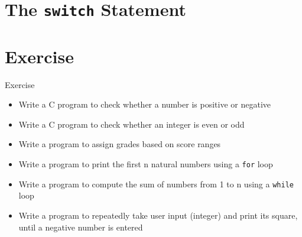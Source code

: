 \documentclass[12pt, aspectratio=169]{beamer}
\begin{document}
    \section{The \texttt{switch} Statement}


    \section{Exercise}

    \begin{frame}{Exercise}
        \begin{itemize}
            \item Write a C program to check whether a number is positive or negative
            \item Write a C program to check whether an integer is even or odd
            \item Write a program to assign grades based on score ranges
            \item Write a program to print the first n natural numbers using a \texttt{for} loop
            \item Write a program to compute the sum of numbers from 1 to n using a \texttt{while} loop
            \item Write a program to repeatedly take user input (integer) and print its square, until a negative number is entered
        \end{itemize}
    \end{frame}
\end{document}
